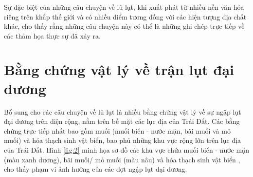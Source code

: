 \documentclass[10pt,twocolumn,letterpaper]{article}
\begin{document}
Sự đặc biệt của những câu chuyện về lũ lụt, khi xuất phát từ nhiều nền văn hóa riêng trên khắp thế giới và có nhiều điểm tương đồng với các hiện tượng địa chất khác, cho thấy rằng những câu chuyện này có thể là những ghi chép trực tiếp về các thảm họa thực sự đã xảy ra.

\section{Bằng chứng vật lý về trận lụt đại dương}

Bổ sung cho các câu chuyện về lũ lụt là nhiều bằng chứng vật lý về sự ngập lụt đại dương trên diện rộng, nằm trên bề mặt các lục địa của Trái Đất. Các bằng chứng trực tiếp nhất bao gồm muối (muối biển - nước mặn, bãi muối và mỏ muối) và hóa thạch sinh vật biển, bao phủ những khu vực rộng lớn trên lục địa của Trái Đất. Hình \ref{fig:2} minh họa sơ đồ các khu vực chứa muối biển - nước mặn (màu xanh dương), bãi muối/ mỏ muối (màu nâu) và hóa thạch sinh vật biển \cite{15,16,86,87}, cho thấy phạm vi ảnh hưởng của các đợt ngập lụt đại dương.
\end{document}
